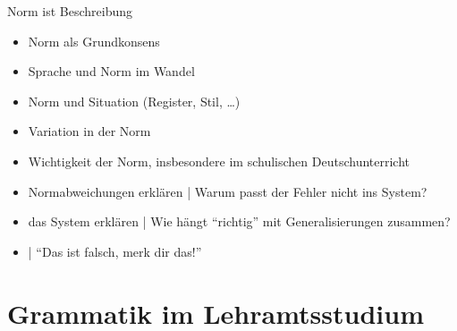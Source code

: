 \begin{frame}
  {Norm ist Beschreibung}
  \onslide<+->
  \begin{itemize}[<+->]
    \item Norm als Grundkonsens
    \item Sprache und Norm im Wandel
    \item Norm und Situation (Register, Stil, \dots)
    \item Variation in der Norm
      \Zeile
    \item \alert{Wichtigkeit der Norm, insbesondere im schulischen Deutschunterricht}
    \item \alert{Normabweichungen erklären} | Warum passt der Fehler nicht ins System?
    \item \alert{das System erklären} | Wie hängt "`richtig"' mit Generalisierungen zusammen?
    \item {} | "`Das ist falsch, merk dir das!"'
  \end{itemize}
\end{frame}


\section{Grammatik im Lehramtsstudium}

